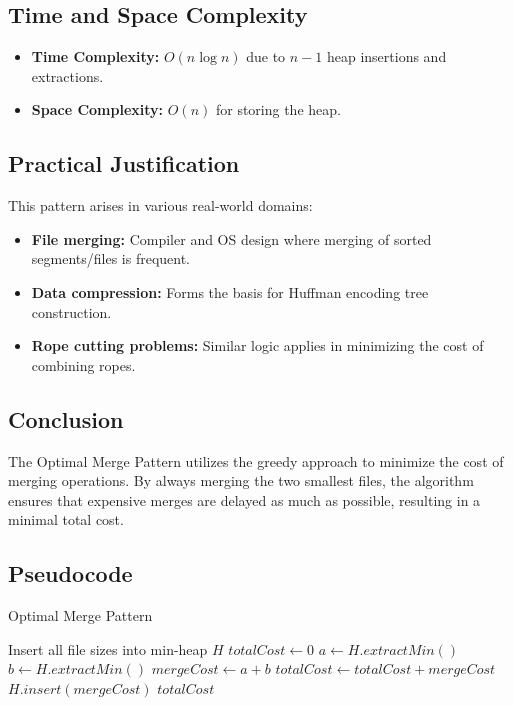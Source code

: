 \documentclass[14pt]{extarticle}
\begin{document}
\subsection*{Time and Space Complexity}

\begin{itemize}
    \item \textbf{Time Complexity:} $O(n \log n)$ due to $n-1$ heap insertions and extractions.
    \item \textbf{Space Complexity:} $O(n)$ for storing the heap.
\end{itemize}

\newpage
\subsection*{Practical Justification}

This pattern arises in various real-world domains:

\begin{itemize}
    \item \textbf{File merging:} Compiler and OS design where merging of sorted segments/files is frequent.
    \item \textbf{Data compression:} Forms the basis for Huffman encoding tree construction.
    \item \textbf{Rope cutting problems:} Similar logic applies in minimizing the cost of combining ropes.
\end{itemize}

\subsection*{Conclusion}

The Optimal Merge Pattern utilizes the greedy approach to minimize the cost of merging operations. By always merging the two smallest files, the algorithm ensures that expensive merges are delayed as much as possible, resulting in a minimal total cost.

\subsection{Pseudocode}
\begin{algorithm}[H]
\caption{Optimal Merge Pattern}
\begin{algorithmic}[1]
    \State Insert all file sizes into min-heap $H$
    \State $totalCost \gets 0$
        \State $a \gets H.extractMin()$
        \State $b \gets H.extractMin()$
        \State $mergeCost \gets a + b$
        \State $totalCost \gets totalCost + mergeCost$
        \State $H.insert(mergeCost)$
    \EndWhile
    \State \Return $totalCost$
\EndProcedure
\end{algorithmic}
\end{algorithm}
\end{document}
